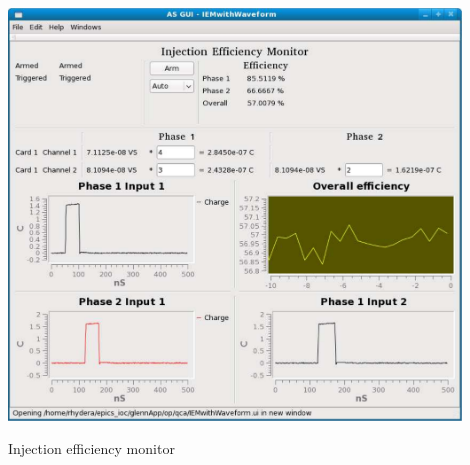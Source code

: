  
\begin{DoxyImage}
\includegraphics[width=12cm]{ASguiExample5}
\caption{Injection efficiency monitor}
\end{DoxyImage}
 